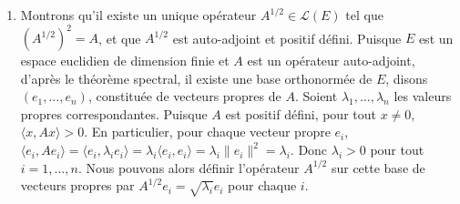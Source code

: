\documentclass[11pt,a4paper]{report}
\begin{document}
\begin{enumerate}
\begin{itemize}
\begin{enumerate}
    \item
      Montrons qu'il existe un unique opérateur
      \(A^{1/2} \in \mathcal{L}(E)\) tel que \((A^{1/2})^2 = A\), et que
      \(A^{1/2}\) est auto-adjoint et positif défini. Puisque \(E\) est
      un espace euclidien de dimension finie et \(A\) est un opérateur
      auto-adjoint, d'après le théorème spectral, il existe une base
      orthonormée de \(E\), disons \((e_1, \dots, e_n)\), constituée de
      vecteurs propres de \(A\). Soient \(\lambda_1, \dots, \lambda_n\)
      les valeurs propres correspondantes. Puisque \(A\) est positif
      défini, pour tout \(x \neq 0\), \(\langle x, Ax \rangle > 0\). En
      particulier, pour chaque vecteur propre \(e_i\),
      \(\langle e_i, Ae_i \rangle = \langle e_i, \lambda_i e_i \rangle = \lambda_i \langle e_i, e_i \rangle = \lambda_i \|e_i\|^2 = \lambda_i\).
      Donc \(\lambda_i > 0\) pour tout \(i=1, \dots, n\). Nous pouvons
      alors définir l'opérateur \(A^{1/2}\) sur cette base de vecteurs
      propres par \(A^{1/2}e_i = \sqrt{\lambda_i}e_i\) pour chaque
      \(i\).
    \end{enumerate}

    \begin{itemize}


\end{itemize}
\end{itemize}
\end{enumerate}
\end{document}
